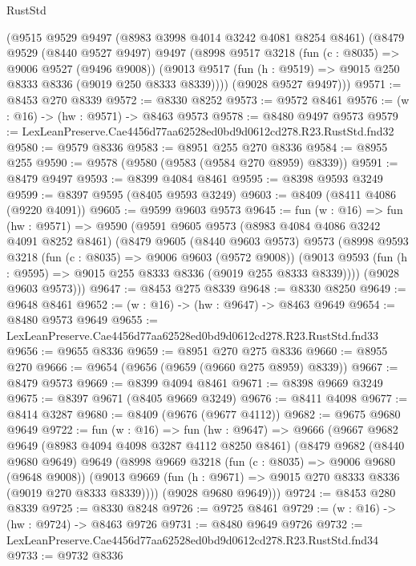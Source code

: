 \begin{lexlean}{RustStd}
\begin{coremodule}
    (@9515
      @9529
      @9497
      (@8983 @3998 @4014 @3242 @4081 @8254 @8461)
      (@8479
        @9529
        (@8440 @9527 @9497)
        @9497
        (@8998
          @9517
          @3218
          (fun (c : @8035) => @9006 @9527 (@9496 @9008))
          (@9013 @9517 (fun (h : @9519) => @9015 @250 @8333 @8336 (@9019 @250 @8333 @8339))))
        (@9028 @9527 @9497)))
@9571 := @8453 @270 @8339
@9572 := @8330 @8252
@9573 := @9572 @8461
@9576 := (w : @16) -> (hw : @9571) -> @8463 @9573
@9578 := @8480 @9497 @9573
@9579 := LexLeanPreserve.Cae4456d77aa62528ed0bd9d0612cd278.R23.RustStd.fnd32
@9580 := @9579 @8336
@9583 := @8951 @255 @270 @8336
@9584 := @8955 @255
@9590 := @9578 (@9580 (@9583 (@9584 @270 @8959) @8339))
@9591 := @8479 @9497
@9593 := @8399 @4084 @8461
@9595 := @8398 @9593 @3249
@9599 := @8397 @9595 (@8405 @9593 @3249)
@9603 := @8409 (@8411 @4086 (@9220 @4091))
@9605 := @9599 @9603 @9573
@9645 := fun (w : @16) =>
  fun (hw : @9571) =>
  @9590
    (@9591
      @9605
      @9573
      (@8983 @4084 @4086 @3242 @4091 @8252 @8461)
      (@8479
        @9605
        (@8440 @9603 @9573)
        @9573
        (@8998
          @9593
          @3218
          (fun (c : @8035) => @9006 @9603 (@9572 @9008))
          (@9013 @9593 (fun (h : @9595) => @9015 @255 @8333 @8336 (@9019 @255 @8333 @8339))))
        (@9028 @9603 @9573)))
@9647 := @8453 @275 @8339
@9648 := @8330 @8250
@9649 := @9648 @8461
@9652 := (w : @16) -> (hw : @9647) -> @8463 @9649
@9654 := @8480 @9573 @9649
@9655 := LexLeanPreserve.Cae4456d77aa62528ed0bd9d0612cd278.R23.RustStd.fnd33
@9656 := @9655 @8336
@9659 := @8951 @270 @275 @8336
@9660 := @8955 @270
@9666 := @9654 (@9656 (@9659 (@9660 @275 @8959) @8339))
@9667 := @8479 @9573
@9669 := @8399 @4094 @8461
@9671 := @8398 @9669 @3249
@9675 := @8397 @9671 (@8405 @9669 @3249)
@9676 := @8411 @4098
@9677 := @8414 @3287
@9680 := @8409 (@9676 (@9677 @4112))
@9682 := @9675 @9680 @9649
@9722 := fun (w : @16) =>
  fun (hw : @9647) =>
  @9666
    (@9667
      @9682
      @9649
      (@8983 @4094 @4098 @3287 @4112 @8250 @8461)
      (@8479
        @9682
        (@8440 @9680 @9649)
        @9649
        (@8998
          @9669
          @3218
          (fun (c : @8035) => @9006 @9680 (@9648 @9008))
          (@9013 @9669 (fun (h : @9671) => @9015 @270 @8333 @8336 (@9019 @270 @8333 @8339))))
        (@9028 @9680 @9649)))
@9724 := @8453 @280 @8339
@9725 := @8330 @8248
@9726 := @9725 @8461
@9729 := (w : @16) -> (hw : @9724) -> @8463 @9726
@9731 := @8480 @9649 @9726
@9732 := LexLeanPreserve.Cae4456d77aa62528ed0bd9d0612cd278.R23.RustStd.fnd34
@9733 := @9732 @8336

\end{coremodule}
\end{lexlean}
